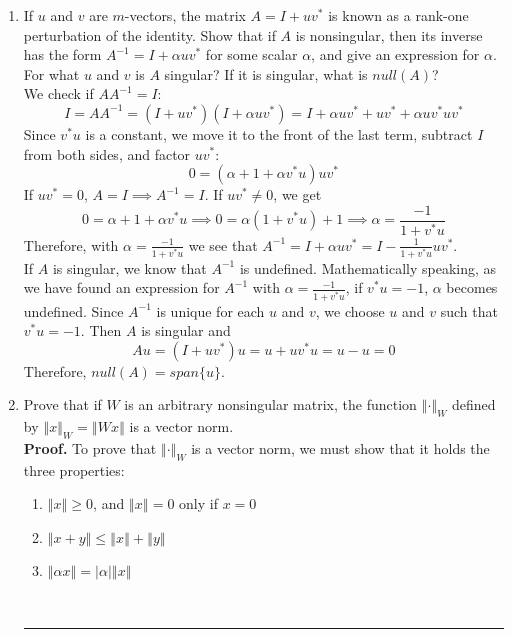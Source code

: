 \documentclass[12pt]{article}
\numberwithin{equation}{section}
\newcommand{\abs}[1]{\left\vert#1\right\vert}
\newcommand{\norm}[1]{\left\Vert#1\right\Vert}
\newenvironment{proof}[1][Proof]{\textbf{#1.} }{\ \rule{0.5em}{0.5em}}
\begin{document}
\begin{enumerate}
\item If $u$ and $v$ are $m$-vectors, the matrix $A=I+uv^*$ is known as a rank-one perturbation of the identity. Show that if $A$ is nonsingular, then its inverse has the form $A^{-1}=I+\alpha uv^*$ for some scalar $\alpha$, and give an expression for $\alpha$. For what $u$ and $v$ is $A$ singular? If it is singular, what is $null(A)$?\\
    We check if $AA^{-1}=I$:
    $$I=AA^{-1}=(I+uv^*)(I+\alpha uv^*)=I+\alpha uv^*+uv^*+\alpha uv^*uv^*$$
    Since $v^*u$ is a constant, we move it to the front of the last term, subtract $I$ from both sides, and factor $uv^*$:
    $$0=(\alpha +1+\alpha v^*u)uv^*$$
    If $uv^*=0$, $A=I\implies A^{-1}=I$. If $uv^*\neq 0$, we get
    $$0=\alpha +1+\alpha v^*u\implies 0=\alpha(1+v^*u)+1\implies\alpha=\frac{-1}{1+v^*u}$$
    Therefore, with $\alpha=\frac{-1}{1+v^*u}$ we see that $A^{-1}=I+\alpha uv^*=I-\frac{1}{1+v^*u}uv^*.$\\
    If $A$ is singular, we know that $A^{-1}$ is undefined. Mathematically speaking, as we have found an expression for $A^{-1}$ with $\alpha=\frac{-1}{1+v^*u}$, if $v^*u=-1$, $\alpha$ becomes undefined. Since $A^{-1}$ is unique for each $u$ and $v$, we choose $u$ and $v$ such that $v^*u=-1$. Then $A$ is singular and
    $$Au=(I+uv^*)u=u+uv^*u=u-u=0$$
    Therefore, $null(A)=span\{u\}$.
\item Prove that if $W$ is an arbitrary nonsingular matrix, the function $\norm{\cdot}_W$ defined by $\norm{x}_W=\norm{Wx}$ is a vector norm.\\
    \begin{proof} %
    To prove that $\norm{\cdot}_W$ is a vector norm, we must show that it holds the three properties:
    \begin{enumerate}
    \item $\norm{x}\geq 0$, and $\norm{x}=0$ only if $x=0$
    \item $\norm{x+y}\leq\norm{x}+\norm{y}$
    \item $\norm{\alpha x}=\abs{\alpha}\norm{x}$
    \end{enumerate}


\end{proof}
\end{enumerate}
\end{document}
